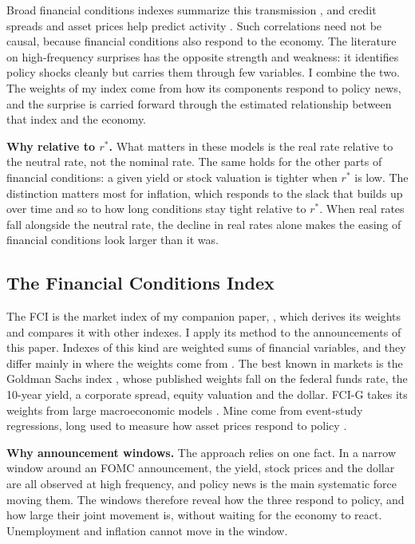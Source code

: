 \documentclass[11pt]{article}
\newcommand{\rs}{r^{*}}
\begin{document}
Broad financial conditions indexes summarize this transmission \citep{hatzius2010,brave2011,ajello2023}, and credit spreads and asset prices help predict activity \citep{gilchrist2012,stock2003}. Such correlations need not be causal, because financial conditions also respond to the economy. The literature on high-frequency surprises has the opposite strength and weakness: it identifies policy shocks cleanly but carries them through few variables. I combine the two. The weights of my index come from how its components respond to policy news, and the surprise is carried forward through the estimated relationship between that index and the economy.

\textbf{Why relative to $r^*$.} What matters in these models is the real rate relative to the neutral rate, not the nominal rate. The same holds for the other parts of financial conditions: a given yield or stock valuation is tighter when $\rs$ is low. The distinction matters most for inflation, which responds to the slack that builds up over time and so to how long conditions stay tight relative to $\rs$. When real rates fall alongside the neutral rate, the decline in real rates alone makes the easing of financial conditions look larger than it was.

\subsection{The Financial Conditions Index}\label{sec:measure}
The FCI is the market index of my companion paper, \citet{fcinote}, which derives its weights and compares it with other indexes. I apply its method to the announcements of this paper. Indexes of this kind are weighted sums of financial variables, and they differ mainly in where the weights come from \citep{hatzius2010}. The best known in markets is the Goldman Sachs index \citep{dudley2000,hatzius2018}, whose published weights fall on the federal funds rate, the 10-year yield, a corporate spread, equity valuation and the dollar. FCI-G takes its weights from large macroeconomic models \citep{ajello2023}. Mine come from event-study regressions, long used to measure how asset prices respond to policy \citep{kuttner2001,bernanke2005,hanson2015,nakamura2018}.

\textbf{Why announcement windows.} The approach relies on one fact. In a narrow window around an FOMC announcement, the yield, stock prices and the dollar are all observed at high frequency, and policy news is the main systematic force moving them. The windows therefore reveal how the three respond to policy, and how large their joint movement is, without waiting for the economy to react. Unemployment and inflation cannot move in the window.
\end{document}
